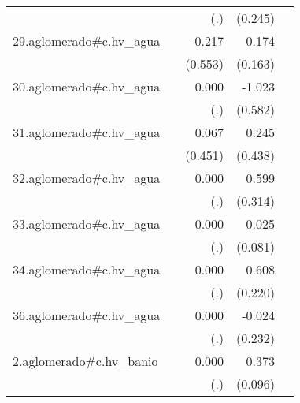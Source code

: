 {\begin{longtable}{l*{4}{D{.}{.}{-1}}}
            &                     &         (.)         &     (0.245)         &                     \\
\addlinespace
29.aglomerado#c.hv\_agua&                     &      -0.217         &       0.174         &                     \\
            &                     &     (0.553)         &     (0.163)         &                     \\
\addlinespace
30.aglomerado#c.hv\_agua&                     &       0.000         &      -1.023         &                     \\
            &                     &         (.)         &     (0.582)         &                     \\
\addlinespace
31.aglomerado#c.hv\_agua&                     &       0.067         &       0.245         &                     \\
            &                     &     (0.451)         &     (0.438)         &                     \\
\addlinespace
32.aglomerado#c.hv\_agua&                     &       0.000         &       0.599         &                     \\
            &                     &         (.)         &     (0.314)         &                     \\
\addlinespace
33.aglomerado#c.hv\_agua&                     &       0.000         &       0.025         &                     \\
            &                     &         (.)         &     (0.081)         &                     \\
\addlinespace
34.aglomerado#c.hv\_agua&                     &       0.000         &       0.608\sym{**} &                     \\
            &                     &         (.)         &     (0.220)         &                     \\
\addlinespace
36.aglomerado#c.hv\_agua&                     &       0.000         &      -0.024         &                     \\
            &                     &         (.)         &     (0.232)         &                     \\
\addlinespace
2.aglomerado#c.hv\_banio&                     &       0.000         &       0.373\sym{***}&                     \\
            &                     &         (.)         &     (0.096)         &                     \\

\end{longtable}}
